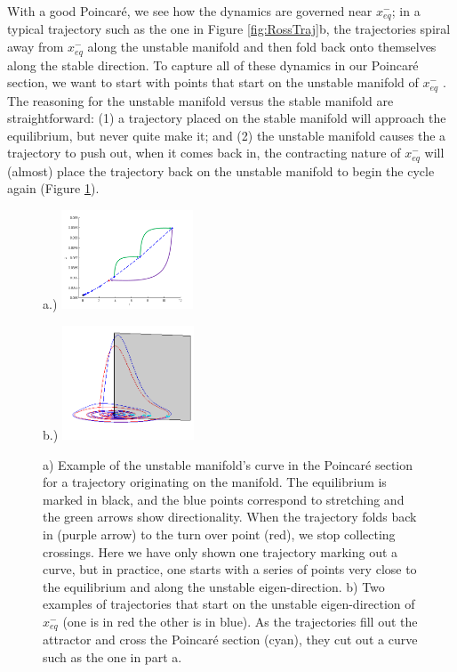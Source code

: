 \documentclass[aip,cha,reprint,
secnumarabic,
nofootinbib, tightenlines,
nobibnotes, showkeys, showpacs,
groupedaddress
]{revtex4-1}
\begin{document}
With a good Poincar\'e, we see how the dynamics are governed near $x_{eq}^{-}$; in a typical trajectory such as the one in Figure \ref{fig:RossTraj}b, the trajectories spiral away from $x_{eq}^{-}$ along the unstable manifold and then fold back onto themselves along the stable direction.  To capture all of these dynamics in our Poincar\'e section, we want to start with points that start on the unstable manifold of $x_{eq}^{-}$ \cite{Eth}.  The reasoning for the unstable manifold versus the stable manifold are straightforward: (1) a trajectory placed on the stable manifold will approach the equilibrium, but never quite make it; and (2) the unstable manifold causes the a trajectory to push out, when it comes back in, the contracting nature of $x_{eq}^{-}$ will (almost) place the trajectory back on the unstable manifold to begin the cycle again (Figure \ref{fig:RossUnstable}).
\begin{figure}[h]
\centering
a.)  \includegraphics[width=0.35\textwidth]{Figs/Section1/kcsinglettrajectoryalongPSdirection.png}

b.)  \includegraphics[width=0.35\textwidth]{Figs/Section1/kcRosslerUnstableManPSc.png}
\caption{
 a) Example of the unstable manifold's curve in the Poincar\'e section for a trajectory originating on the manifold.  The equilibrium is marked in black, and the blue points correspond to stretching and the green arrows show directionality.  When the trajectory folds back in (purple arrow) to the turn over point (red), we stop collecting crossings.  Here we have only shown one trajectory marking out a curve, but in practice, one starts with a series of points very close to the equilibrium and along the unstable eigen-direction.
b) Two examples of trajectories that start on the unstable eigen-direction of $x_{eq}^{-}$ (one is in red the other is in blue). As the trajectories fill out the attractor and cross the Poincar\'e section (cyan), they cut out a curve such as the one in part a.
}
 \label{fig:RossUnstable}
\end{figure}
\end{document}
